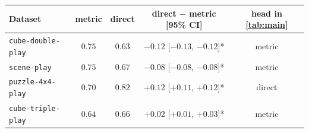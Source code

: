 \begin{tabular}{lccc c}
\toprule
Dataset & metric & direct & direct $-$ metric [95\% CI] & head in \cref{tab:main} \\
\midrule
\texttt{cube-double-play} & $\mathbf{0.75}$ & $0.63$ & $-0.12$ [$-0.13$, $-0.12$]* & metric \\
\texttt{scene-play} & $\mathbf{0.75}$ & $0.67$ & $-0.08$ [$-0.08$, $-0.08$]* & metric \\
\texttt{puzzle-4x4-play} & $0.70$ & $\mathbf{0.82}$ & $+0.12$ [$+0.11$, $+0.12$]* & direct \\
\texttt{cube-triple-play} & $0.64$ & $\mathbf{0.66}$ & $+0.02$ [$+0.01$, $+0.03$]* & metric \\
\bottomrule
\end{tabular}
